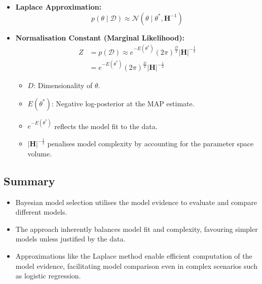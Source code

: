 \begin{itemize}
    \item \textbf{Laplace Approximation:}
          \[
              p(\theta \mid \mathcal{D}) \approx \mathcal{N}(\theta \mid \theta^*, \mathbf{H}^{-1})
          \]
    \item \textbf{Normalisation Constant (Marginal Likelihood):}
          \begin{align*}
              Z & = p(\mathcal{D}) \approx e^{-E(\theta^*)} (2\pi)^{\frac{D}{2}} |\mathbf{H}|^{-\frac{1}{2}} \\
                & = e^{-E(\theta^*)} (2\pi)^{\frac{D}{2}} \left|\mathbf{H}\right|^{-\frac{1}{2}}
          \end{align*}
          \begin{itemize}
              \item $D$: Dimensionality of $\theta$.
              \item $E(\theta^*)$: Negative log-posterior at the MAP estimate.
          \end{itemize}

          \begin{itemize}
              \item $e^{-E(\theta^*)}$ reflects the model fit to the data.
              \item $|\mathbf{H}|^{-\frac{1}{2}}$ penalises model complexity by accounting for the parameter space volume.
          \end{itemize}
\end{itemize}

\subsection{Summary}

\begin{itemize}
    \item Bayesian model selection utilises the model evidence to evaluate and compare different models.
    \item The approach inherently balances model fit and complexity, favouring simpler models unless justified by the data.
    \item Approximations like the Laplace method enable efficient computation of the model evidence, facilitating model comparison even in complex scenarios such as logistic regression.
\end{itemize}
